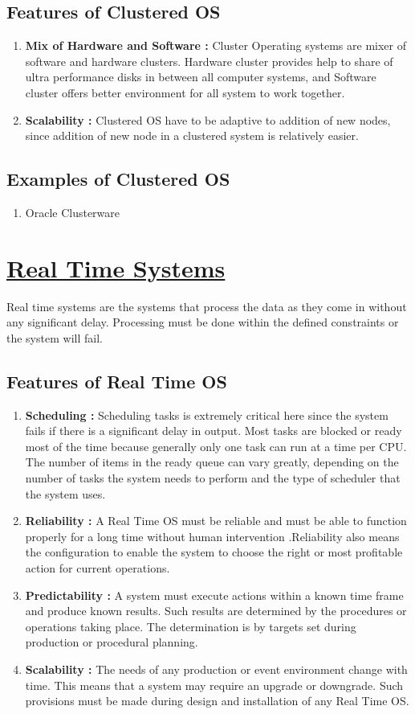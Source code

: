 \documentclass{article}
\begin{document}
\subsection{Features of Clustered OS}
\begin{enumerate}
    \item \textbf{Mix of Hardware and Software :}
    Cluster Operating systems are mixer of software and hardware clusters. Hardware cluster provides help to share of ultra performance disks in between all computer systems, and Software cluster offers better environment for all system to work together.
    \item \textbf{Scalability :}
    Clustered OS have to be adaptive to addition of new nodes, since addition of new node in a clustered system is relatively easier. 
\end{enumerate}
\subsection{Examples of Clustered OS}
\begin{enumerate}
    \item Oracle Clusterware
\end{enumerate}
\section{\underline{Real Time Systems}}
Real time systems are the systems that process the data as they come in without any significant delay. Processing must be done within the defined constraints or the system will fail.
\subsection{Features of Real Time OS}
\begin{enumerate}
    \item \textbf{Scheduling :} Scheduling tasks is extremely critical here since the system fails if there is a significant delay in output. Most tasks are blocked or ready most of the time because generally only one task can run at a time per CPU. The number of items in the ready queue can vary greatly, depending on the number of tasks the system needs to perform and the type of scheduler that the system uses.
    \item \textbf{Reliability :} A Real Time OS must be reliable and must be able to function properly for a long time without human intervention .Reliability also means the configuration to enable the system to choose the right or most profitable action for current operations.
    \item \textbf{Predictability :} A system must execute actions within a known time frame and produce known results. Such results are determined by the procedures or operations taking place. The determination is by targets set during production or procedural planning.
    \item \textbf{Scalability :} The needs of any production or event environment change with time. This means that a system may require an upgrade or downgrade. Such provisions must be made during design and installation of any Real Time OS.
\end{enumerate}
\end{document}
